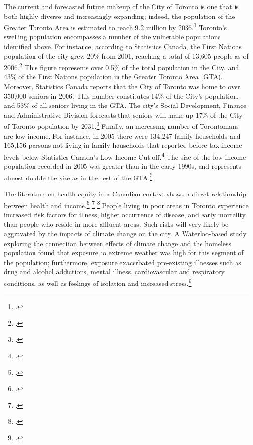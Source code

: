 The current and forecasted future makeup of the City of Toronto is one that is both highly diverse and increasingly expanding; indeed, the population of the Greater Toronto Area is estimated to reach 9.2 million by 2036.\footcite[][]{DemoProjections2012}
Toronto's swelling population encompasses a number of the vulnerable populations identified above. 
For instance, according to Statistics Canada, the First Nations population of the city grew 20\% from 2001, reaching a total of 13,605 people as of 2006.\footcite[][]{2006TorontoProfile}
This figure represents over 0.5\% of the total population in the City, and 43\% of the First Nations population in the Greater Toronto Area (GTA). 
Moreover, Statistics Canada reports that the City of Toronto was home to over 350,000 seniors in 2006.
This number constitutes 14\% of the City’s population, and 53\% of all seniors living in the GTA. 
The city's Social Development, Finance and Administrative Division forecasts that seniors will make up 17\% of the City of Toronto population by 2031.\footcite[][p. 5]{SeniorsDemographicSnapshot}
Finally, an increasing number of Torontonians are low-income.
For instance, in 2005 there were 134,247 family households and 165,156 persons not living in family households that reported before-tax income levels below Statistics Canada's Low Income Cut-off.\footcite[][p. 5]{LowIncomeProfile}
The size of the low-income population recorded in 2005 was greater than in the early 1990s, and represents almost double the size as in the rest of the GTA.\footcite[][p. 6]{LowIncomeProfile}



The literature on health equity in a Canadian context shows a direct relationship between health and income.\footcite[][]{HotWeatherResponse2006} \footcite[][]{PovertyMakingSick} \footcite[][]{PovertyInequalityHealth}
People living in poor areas in Toronto experience increased risk factors for illness, higher occurrence of disease, and early mortality than people who reside in more affluent areas.
Such risks will very likely be aggravated by the impacts of climate change on the city.
A Waterloo-based study exploring the connection between effects of climate change and the homeless population found that exposure to extreme weather was high for this segment of the population; furthermore, exposure exacerbated pre-existing illnesses such as drug and alcohol addictions, mental illness, cardiovascular and respiratory conditions, as well as feelings of isolation and increased stress.\footcite[][]{HomelessnessWaterloo}



